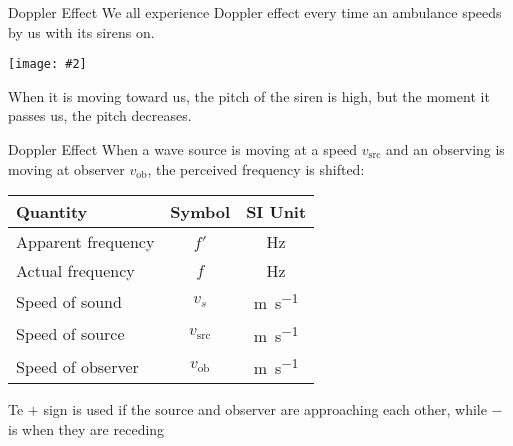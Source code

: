 \documentclass[12pt,aspectratio=169]{beamer}
\newcommand{\pic}[2]{\texttt{[image: \#2]}}
\newcommand{\eq}[2]{\vspace{#1}{\Large\begin{displaymath}#2\end{displaymath}}}
\begin{document}
\begin{frame}{Doppler Effect}
  We all experience Doppler effect every time an ambulance speeds by us with
  its sirens on.
  \begin{center}
    \pic{.6}{toronto-ambulance.jpg}
  \end{center}
  When it is moving toward us, the pitch of the siren is high, but the moment
  it passes us, the pitch decreases.
\end{frame}



\begin{frame}{Doppler Effect}
  When a wave source is moving at a speed $v_{\textrm{src}}$ and an observing is
  moving at observer $v_{\textrm{ob}}$, the perceived frequency is shifted:

  \eq{-.2in}{
    \boxed{f'=\frac{v_s\pm v_{\textrm{ob}}}{v_s\mp v_{\textrm{src}}}f}
  }
  \begin{center}
    \begin{tabular}{l|c|c}
      \rowcolor{pink}
      \textbf{Quantity} & \textbf{Symbol} & \textbf{SI Unit} \\ \hline
      Apparent frequency  & $f'$   & \si{\hertz} \\
      Actual frequency    & $f$    & \si{\hertz} \\
      Speed of sound      & $v_s$ & \si{\metre\per\second}\\
      Speed of source & $v_{\textrm{src}}$ & \si{\metre\per\second}\\
      Speed of observer & $v_{\textrm{ob}}$ & \si{\metre\per\second}
    \end{tabular}
  \end{center}
  Te $+$ sign is used if the source and observer are approaching each other,
  while $-$ is when they are receding
\end{frame}
\end{document}
